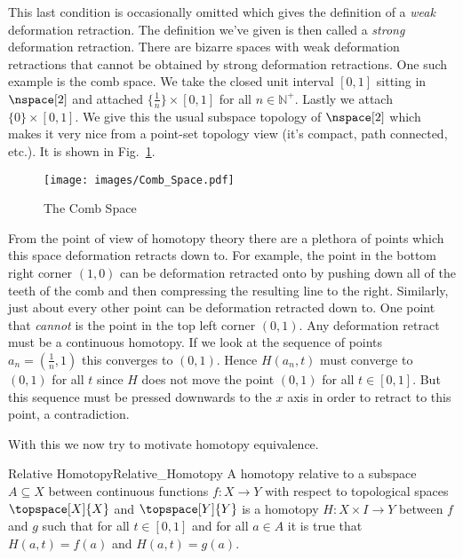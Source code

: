 \documentclass[oneside]{book}                                                  %
\begin{document}
                This last condition is occasionally omitted which gives the
                definition of a \textit{weak} deformation retraction. The
                definition we've given is then called a \textit{strong}
                deformation retraction. There are bizarre spaces with weak
                deformation retractions that cannot be obtained by strong
                deformation retractions. One such example is the comb space.
                We take the closed unit interval $[0,1]$ sitting in $\nspace[2]$
                and attached $\{\frac{1}{n}\}\times[0,1]$ for all
                $n\in\mathbb{N}^{+}$. Lastly we attach $\{0\}\times[0,1]$. We
                give this the usual subspace topology of $\nspace[2]$ which
                makes it very nice from a point-set topology view (it's compact,
                path connected, etc.). It is shown in Fig.~\ref{fig:Comb_Space}.
                \begin{figure}[H]
                    \centering
                    \captionsetup{type=figure}
                    \texttt{[image: images/Comb\_Space.pdf]}
                    \caption{The Comb Space}
                    \label{fig:Comb_Space}
                \end{figure}
                From the point of view of homotopy theory there are a plethora
                of points which this space deformation retracts down to. For
                example, the point in the bottom right corner $(1,0)$ can be
                deformation retracted onto by pushing down all of the teeth of
                the comb and then compressing the resulting line to the right.
                Similarly, just about every other point can be deformation
                retracted down to. One point that \textit{cannot} is the point
                in the top left corner $(0,1)$. Any deformation retract must
                be a continuous homotopy. If we look at the sequence of points
                $a_{n}=(\frac{1}{n},1)$ this converges to $(0,1)$. Hence
                $H(a_{n},t)$ must converge to $(0,1)$ for all $t$ since $H$ does
                not move the point $(0,1)$ for all $t\in[0,1]$. But this
                sequence must be pressed downwards to the $x$ axis in order to
                retract to this point, a contradiction.
                \par\hfill\par
                With this we now try to motivate homotopy equivalence.
                \begin{fdefinition}{Relative Homotopy}{Relative_Homotopy}
                    A homotopy relative to a subspace $A\subseteq{X}$ between
                    continuous functions $f:X\rightarrow{Y}$ with respect to
                    topological spaces $\topspace[X]{X}$ and $\topspace[Y]{Y}$
                    is a homotopy $H:X\times{I}\rightarrow{Y}$ between $f$ and
                    $g$ such that for all $t\in[0,1]$ and for all $a\in{A}$ it
                    is true that $H(a,t)=f(a)$ and $H(a,t)=g(a)$.
                \end{fdefinition}
\end{document}
